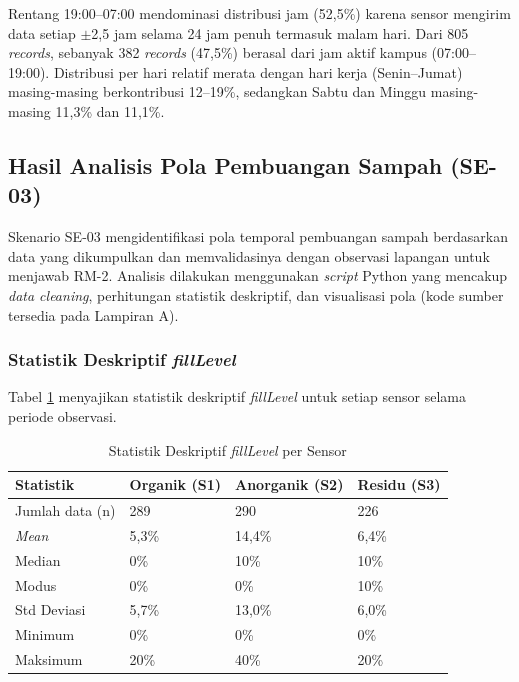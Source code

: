 Rentang 19:00--07:00 mendominasi distribusi jam (52,5\%) karena sensor mengirim data setiap $\pm$2,5 jam selama 24 jam penuh termasuk malam hari. Dari 805 \textit{records}, sebanyak 382 \textit{records} (47,5\%) berasal dari jam aktif kampus (07:00--19:00). Distribusi per hari relatif merata dengan hari kerja (Senin--Jumat) masing-masing berkontribusi 12--19\%, sedangkan Sabtu dan Minggu masing-masing 11,3\% dan 11,1\%.

\subsection{Hasil Analisis Pola Pembuangan Sampah (SE-03)}

Skenario SE-03 mengidentifikasi pola temporal pembuangan sampah berdasarkan data yang dikumpulkan dan memvalidasinya dengan observasi lapangan untuk menjawab RM-2. Analisis dilakukan menggunakan \textit{script} Python yang mencakup \textit{data cleaning}, perhitungan statistik deskriptif, dan visualisasi pola (kode sumber tersedia pada Lampiran A).

\subsubsection{Statistik Deskriptif \textit{fillLevel}}

Tabel \ref{tab:statistik-filllevel} menyajikan statistik deskriptif \textit{fillLevel} untuk setiap sensor selama periode observasi.

\begin{table}[H]
  \caption{Statistik Deskriptif \textit{fillLevel} per Sensor}
  \label{tab:statistik-filllevel}
  \centering
  \begin{tabular}{| l | l | l | l |}
    \hline
    \textbf{Statistik} & \textbf{Organik (S1)} & \textbf{Anorganik (S2)} & \textbf{Residu (S3)} \\
    \hline
    Jumlah data (n) & 289    & 290    & 226 \\
    \hline
    \textit{Mean}   & 5,3\%  & 14,4\% & 6,4\% \\
    \hline
    Median          & 0\%    & 10\%   & 10\% \\
    \hline
    Modus           & 0\%    & 0\%    & 10\% \\
    \hline
    Std Deviasi     & 5,7\%  & 13,0\% & 6,0\% \\
    \hline
    Minimum         & 0\%    & 0\%    & 0\% \\
    \hline
    Maksimum        & 20\%   & 40\%   & 20\% \\
    \hline
  \end{tabular}
\end{table}

